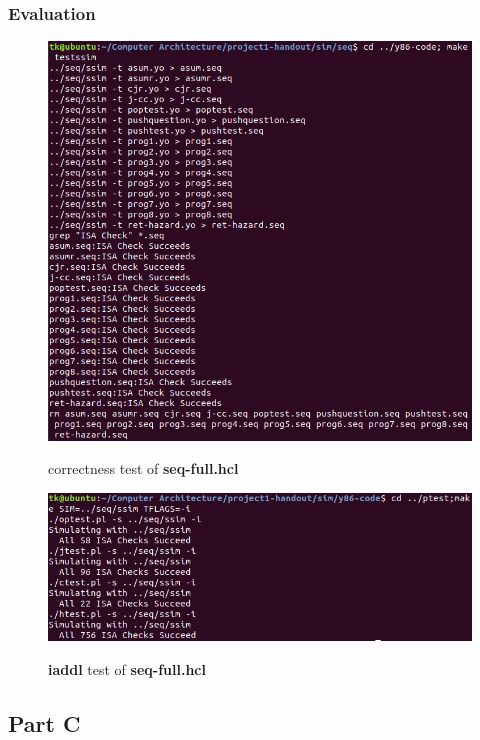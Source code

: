 \documentclass{article}
\begin{document}
\subsubsection{Evaluation}

\begin{figure}[H]
	\begin{minipage}[h]{\textwidth}
		\centering
		\includegraphics[width=1\textwidth]{seq_correctness.png}
		\caption{correctness test of \textbf{seq-full.hcl}} \label{Fig-G4}
		\hspace{5mm}
		\includegraphics[width=1\textwidth]{seq_iaddl.png}
		\caption{\textbf{iaddl} test of \textbf{seq-full.hcl}} \label{Fig-G5}
	\end{minipage}
\end{figure}

\subsection{Part C}
\end{document}
